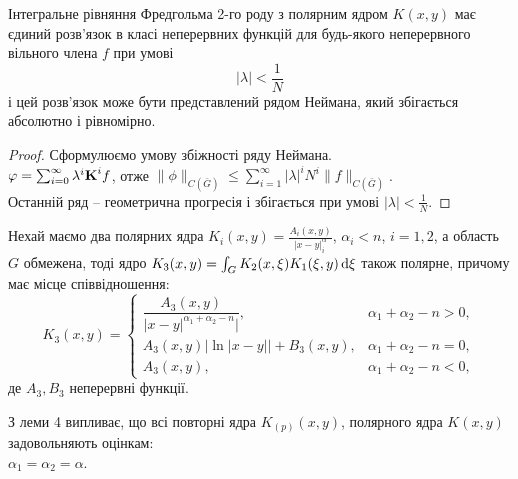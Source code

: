\begin{theorem}
	Інтегральне рівняння Фредгольма 2-го роду з полярним ядром $K(x, y)$ має єдиний розв’язок в класі неперервних функцій для будь-якого неперервного вільного члена $f$ при умові
	\begin{equation}
		\label{eq:1.23}
		|\lambda| < \dfrac{1}{N}
	\end{equation}
	і цей розв’язок може бути представлений рядом Неймана, який збігається абсолютно і рівномірно.
\end{theorem}
\begin{proof}
	Сформулюємо умову збіжності ряду Неймана. \\

	$\phi = \sum_{i = 0}^\infty \lambda^i \bf{K}^i f$, отже $\|\phi\|_{C(\bar G)} \le \sum_{i = 1}^\infty |\lambda|^i N^i \|f\|_{C(\bar G)}$. \\

	Останній ряд – геометрична прогресія і збігається при умові $|\lambda| < \frac{1}{N}$.
\end{proof}

\begin{lemma}
	Нехай маємо два полярних ядра $K_i(x, y) = \frac{A_i(x, y)}{|x - y|^\alpha_i}$, $\alpha_i < n$, $i = 1, 2$, а область $G$ обмежена, тоді ядро $K_3(x, y) = \int_G K_2(x, \xi) K_1(\xi, y) \diff \xi$ також полярне, причому має місце співвідношення:
	\begin{equation}
		\label{eq:1.24}
		K_3(x, y) = \begin{cases}
			\dfrac{A_3(x, y)}{|x - y|^{\alpha_1 + \alpha_2 - n}|}, & \alpha_1 + \alpha_2 - n > 0, \\
			A_3(x, y) |\ln|x - y|| + B_3(x, y), & \alpha_1 + \alpha_2 - n = 0, \\
			A_3(x, y), & \alpha_1 + \alpha_2 - n < 0,
		\end{cases}
	\end{equation}
	де $A_3, B_3$ неперервні функції.
\end{lemma}

З леми 4 випливає, що всі повторні ядра $K_{(p)}(x, y)$, полярного ядра $K(x, y)$ задовольняють оцінкам: \\

$\alpha_1 = \alpha_2 = \alpha$.


